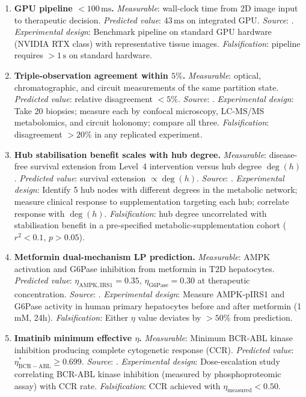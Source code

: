 \begin{enumerate}[label=\textbf{M\arabic*.}, leftmargin=3em]
\item \textbf{GPU pipeline $< 100\,\mathrm{ms}$.}
  \emph{Measurable}: wall-clock time from 2D image input to therapeutic decision.
  \emph{Predicted value}: $43\,\mathrm{ms}$ on integrated GPU.
  \emph{Source}: .
  \emph{Experimental design}: Benchmark pipeline on standard GPU hardware
    (NVIDIA RTX class) with representative tissue images.
  \emph{Falsification}: pipeline requires $> 1\,\mathrm{s}$ on standard hardware.

\item \textbf{Triple-observation agreement within $5\%$.}
  \emph{Measurable}: optical, chromatographic, and circuit measurements of the
    same partition state.
  \emph{Predicted value}: relative disagreement $< 5\%$.
  \emph{Source}: .
  \emph{Experimental design}: Take 20 biopsies; measure each by confocal
    microscopy, LC-MS/MS metabolomics, and circuit holonomy; compare all three.
  \emph{Falsification}: disagreement $> 20\%$ in any replicated experiment.

\item \textbf{Hub stabilisation benefit scales with hub degree.}
  \emph{Measurable}: disease-free survival extension from Level~4 intervention
    versus hub degree $\deg(h)$.
  \emph{Predicted value}: survival extension $\propto \deg(h)$.
  \emph{Source}: .
  \emph{Experimental design}: Identify 5 hub nodes with different degrees in
    the metabolic network; measure clinical response to supplementation targeting
    each hub; correlate response with $\deg(h)$.
  \emph{Falsification}: hub degree uncorrelated with stabilisation benefit in
    a pre-specified metabolic-supplementation cohort ($r^2 < 0.1$, $p > 0.05$).

\item \textbf{Metformin dual-mechanism LP prediction.}
  \emph{Measurable}: AMPK activation and G6Pase inhibition from metformin in
    T2D hepatocytes.
  \emph{Predicted value}: $\eta_{\mathrm{AMPK,IRS1}} = 0.35$,
    $\eta_{\mathrm{G6Pase}} = 0.30$ at therapeutic concentration.
  \emph{Source}: .
  \emph{Experimental design}: Measure AMPK-pIRS1 and G6Pase activity in
    human primary hepatocytes before and after metformin (1 mM, 24h).
  \emph{Falsification}: Either $\eta$ value deviates by $> 50\%$ from prediction.

\item \textbf{Imatinib minimum effective $\eta$.}
  \emph{Measurable}: Minimum BCR-ABL kinase inhibition producing complete
    cytogenetic response (CCR).
  \emph{Predicted value}: $\eta^*_{\mathrm{BCR-ABL}} \geq 0.699$.
  \emph{Source}: .
  \emph{Experimental design}: Dose-escalation study correlating BCR-ABL
    kinase inhibition (measured by phosphoproteomic assay) with CCR rate.
  \emph{Falsification}: CCR achieved with $\eta_{\mathrm{measured}} < 0.50$.


\end{enumerate}
